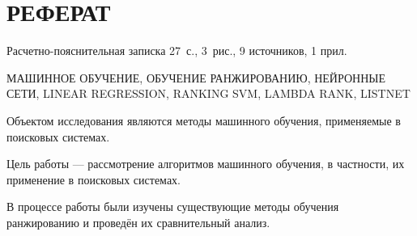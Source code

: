 \chapter*{РЕФЕРАТ}

Расчетно-пояснительная записка 27~с., 3~рис., 9 источников, 1 прил.
\begin{sloppypar}
\MakeUppercase{машинное обучение, обучение ранжированию, нейронные сети, linear regression, ranking svm, lambda rank, listnet}
\end{sloppypar}

Объектом исследования являются методы машинного обучения, применяемые в поисковых системах.

Цель работы --- рассмотрение алгоритмов машинного обучения, в частности, их применение в поисковых системах.

В процессе работы были изучены существующие методы обучения ранжированию и проведён их сравнительный анализ.

\setcounter{page}{3}